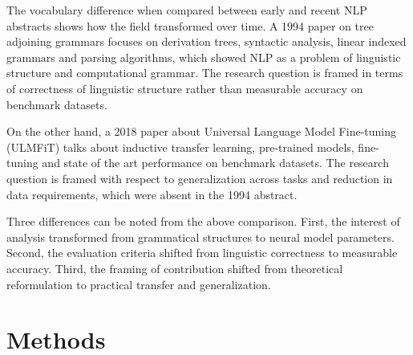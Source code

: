 
The vocabulary difference when compared between early and recent NLP abstracts shows how the field transformed over time. A 1994 paper on tree adjoining grammars focuses on derivation trees, syntactic analysis, linear indexed grammars and parsing algorithms, which showed NLP as a problem of linguistic structure and computational grammar. The research question is framed in terms of correctness of linguistic structure rather than measurable accuracy on benchmark datasets.

On the other hand, a 2018 paper about Universal Language Model Fine-tuning (ULMFiT) talks about inductive transfer learning, pre-trained models, fine-tuning and state of the art performance on benchmark datasets. The research question is framed with respect to generalization across tasks and reduction in data requirements, which were absent in the 1994 abstract.

Three differences can be noted from the above comparison. First, the interest of analysis transformed from grammatical structures to neural model parameters. Second, the evaluation criteria shifted from linguistic correctness to measurable accuracy. Third, the framing of contribution shifted from theoretical reformulation to practical transfer and generalization.
\section{Methods}
\label{sec:methods}



